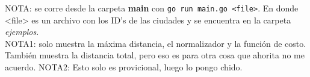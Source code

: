 \documentclass[12pt,a4paper]{article}
\begin{document}
NOTA: se corre desde la carpeta \textbf{main} con \texttt{go run main.go <file>}.
En donde <file> es un archivo con los ID's de las ciudades y se encuentra en la
carpeta \textit{ejemplos}.\\
NOTA1: solo muestra la máxima distancia, el normalizador y la función de costo.
También muestra la distancia total, pero eso es para otra cosa que ahorita no me
acuerdo.
NOTA2: Esto solo es provicional, luego lo pongo chido.
\end{document}
